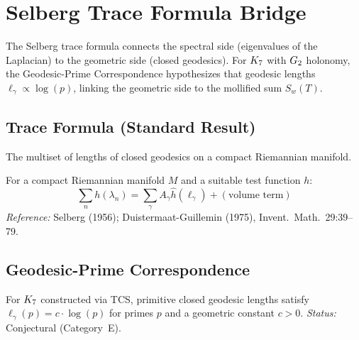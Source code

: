 \chapter{Selberg Trace Formula Bridge}\label{chap:selberg_bridge}

The Selberg trace formula connects the spectral side (eigenvalues of the
Laplacian) to the geometric side (closed geodesics). For $K_7$ with
$G_2$ holonomy, the Geodesic-Prime Correspondence hypothesizes that
geodesic lengths $\ell_\gamma \propto \log(p)$, linking the geometric
side to the mollified sum $S_w(T)$.

\section{Trace Formula (Standard Result)}

\begin{definition}\label{def:LengthSpectrum}
    The multiset of lengths of closed geodesics on a compact Riemannian manifold.
\end{definition}

\begin{theorem}\label{thm:trace_formula}
    For a compact Riemannian manifold $M$ and a suitable test function $h$:
    \[
        \sum_n h(\lambda_n) = \sum_\gamma A_\gamma \hat{h}(\ell_\gamma) + (\text{volume term})
    \]
    \emph{Reference:} Selberg (1956); Duistermaat-Guillemin (1975), Invent.\ Math.\ 29:39--79.
\end{theorem}

\section{Geodesic-Prime Correspondence}

\begin{theorem}\label{thm:geodesic_prime}
    For $K_7$ constructed via TCS, primitive closed geodesic lengths satisfy
    $\ell_\gamma(p) = c \cdot \log(p)$ for primes $p$ and a geometric constant $c > 0$.
    \emph{Status:} Conjectural (Category~E).
\end{theorem}

